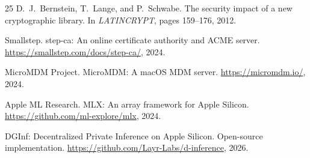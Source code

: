 \documentclass[10pt,twocolumn,letterpaper]{article}
\begin{document}
\begin{thebibliography}{25}
D.~J.~Bernstein, T.~Lange, and P.~Schwabe. The security impact of a new cryptographic library. In \emph{LATINCRYPT}, pages 159--176, 2012.

Smallstep. step-ca: An online certificate authority and ACME server. \url{https://smallstep.com/docs/step-ca/}, 2024.

MicroMDM Project. MicroMDM: A macOS MDM server. \url{https://micromdm.io/}, 2024.

Apple ML Research. MLX: An array framework for Apple Silicon. \url{https://github.com/ml-explore/mlx}, 2024.

DGInf: Decentralized Private Inference on Apple Silicon. Open-source implementation. \url{https://github.com/Layr-Labs/d-inference}, 2026.

\end{thebibliography}
\end{document}
